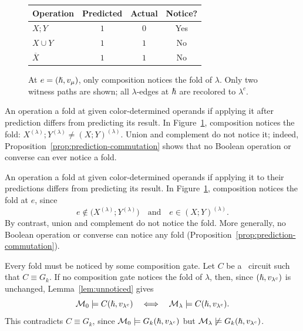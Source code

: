 \begin{figure}[H]
\begin{minipage}[c]{0.58\linewidth}
  \end{minipage}\hfill%
  \begin{minipage}[c]{0.40\linewidth}
    \centering
    {\footnotesize
    \renewcommand{\arraystretch}{1.16}%
    \begin{tabular}{@{}lccc@{}}
      \toprule
      Operation & Predicted & Actual & Notice? \\
      \midrule
      $X;Y$         & $1$ & $0$ & Yes \\
      $X\cup Y$     & $1$ & $1$ & No \\
      $\overline X$ & $1$ & $1$ & No \\
      \bottomrule
    \end{tabular}}
  \end{minipage}
  \caption{At $e=(\hslash,v_\mu)$, only composition notices the fold of $\lambda$.
    Only two witness paths are shown; all $\lambda$-edges at $\hslash$ are recolored to $\lambda^c$.}
  \label{fig:prediction}
\end{figure}

An operation  a fold at given color-determined
operands if applying it after prediction differs from predicting its
result. In Figure~\ref{fig:prediction}, composition notices the fold:
$X^{(\lambda)};Y^{(\lambda)}\ne(X;Y)^{(\lambda)}$.
Union and complement do not notice it; indeed, Proposition~\ref{prop:prediction-commutation}
shows that no Boolean operation or converse can ever notice a fold.
\fi

An operation  a fold at given
color-determined operands if applying it to
their predictions differs from predicting
its result. In Figure~\ref{fig:prediction}, composition notices
the fold at $e$, since
\[
  e\notin\bigl(X^{(\lambda)};Y^{(\lambda)}\bigr)
  \quad \text{and} \quad
  e\in(X;Y)^{(\lambda)}.
\]
By contrast, union and complement do not
notice the fold. More generally, no Boolean
operation or converse can notice any fold
(Proposition~\ref{prop:prediction-commutation}).

Every fold must be noticed by some composition gate.
Let $C$ be a \CoR\ circuit such that $C\equiv G_k$.
If no composition gate notices the fold of $\lambda$,
then, since $(\hslash,v_{\lambda^c})$ is unchanged,
Lemma~\ref{lem:unnoticed} gives
\[
  \mathcal M_0\models C(\hslash,v_{\lambda^c})
  \quad\Longleftrightarrow\quad
  \mathcal M_\lambda\models C(\hslash,v_{\lambda^c}).
\]
This contradicts $C\equiv G_k$, since
$\mathcal M_0\models G_k(\hslash,v_{\lambda^c})$
but $\mathcal M_\lambda\not\models G_k(\hslash,v_{\lambda^c})$.

